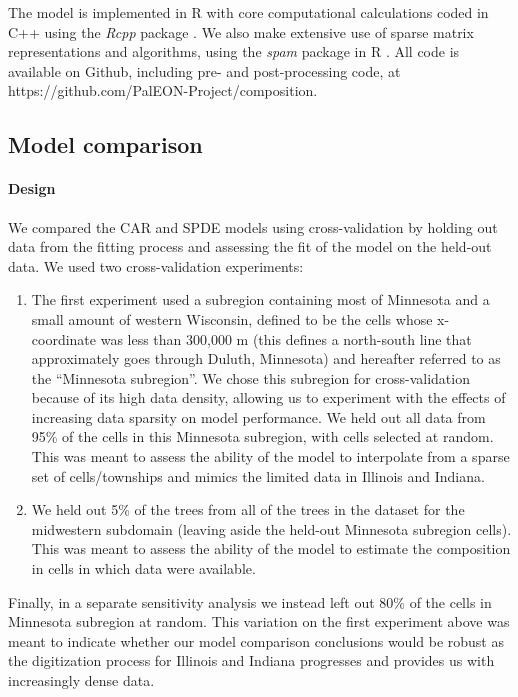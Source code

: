 \documentclass[10pt,letterpaper]{article}
\begin{document}
The model is implemented in R \cite{R:2014} with core computational
calculations coded in C++ using the \emph{Rcpp} package \cite{Edde:Fran:2011}.
We also make extensive use of sparse matrix representations and algorithms,
using the \emph{spam} package in R \cite{Furr:Sain:2010}. All code
is available on Github, including pre- and post-processing code, at
https://github.com/PalEON-Project/composition. 


\subsection*{Model comparison\label{sec:Model-comparison}}


\paragraph*{Design}

We compared the CAR and SPDE models using cross-validation by holding
out data from the fitting process and assessing the fit of the model
on the held-out data. We used two cross-validation experiments:
\begin{enumerate}
\item The first experiment used a subregion containing most of Minnesota
and a small amount of western Wisconsin, defined to be the cells whose
x-coordinate was less than 300,000 m (this defines a north-south line
that approximately goes through Duluth, Minnesota) and hereafter referred
to as the ``Minnesota subregion''. We chose this subregion for cross-validation
because of its high data density, allowing us to experiment with the
effects of increasing data sparsity on model performance. We held
out all data from 95\% of the cells in this Minnesota subregion, with
cells selected at random. This was meant to assess the ability of
the model to interpolate from a sparse set of cells/townships and
mimics the limited data in Illinois and Indiana.
\item We held out 5\% of the trees from all of the trees in the dataset
for the midwestern subdomain (leaving aside the held-out Minnesota
subregion cells). This was meant to assess the ability of the model
to estimate the composition in cells in which data were available. 
\end{enumerate}
Finally, in a separate sensitivity analysis we instead left out 80\%
of the cells in Minnesota subregion at random. This variation on the
first experiment above was meant to indicate whether our model comparison
conclusions would be robust as the digitization process for Illinois
and Indiana progresses and provides us with increasingly dense data. 
\end{document}

